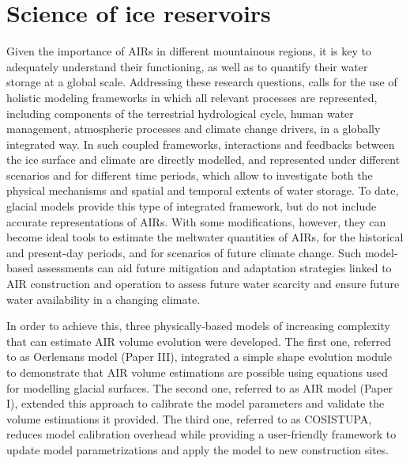 \chapter{Science of ice reservoirs}
\label{chap:science}


Given the importance of \ac{AIRs} in different mountainous regions, it is key to adequately understand their
functioning, as well as to quantify their water storage at a global scale. Addressing these research questions,
calls for the use of holistic modeling frameworks in which all relevant processes are represented, including
components of the terrestrial hydrological cycle, human water management, atmospheric processes and climate
change drivers, in a globally integrated way. In such coupled frameworks, interactions and feedbacks between the
ice surface and climate are directly modelled, and represented under different scenarios and for different time
periods, which allow to investigate both the physical mechanisms and spatial and temporal extents of water
storage. To date, glacial models provide this type of integrated framework, but do not include accurate
representations of \ac{AIRs}. With some modifications, however, they can become ideal tools to estimate the
meltwater quantities of \ac{AIRs}, for the historical and present-day periods, and for scenarios of future
climate change. Such model-based assessments can aid future mitigation and adaptation strategies linked to AIR
construction and operation to assess future water scarcity and ensure future water availability in a changing
climate.

In order to achieve this, three physically-based models of increasing complexity that can estimate
AIR volume evolution were developed. The first one, referred to as Oerlemans model (Paper III), integrated a simple shape
evolution module to demonstrate that AIR volume estimations are possible using equations used for modelling
glacial surfaces. The second one, referred to as AIR model (Paper I), extended this approach to calibrate the
model parameters and validate the volume estimations it provided. The third one, referred to as COSISTUPA,
reduces model calibration overhead while providing a user-friendly framework to update model parametrizations
and apply the model to new construction sites. 


